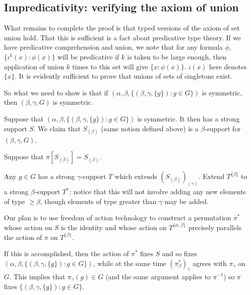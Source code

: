 \documentclass[112pt]{article}
\begin{document}
\newpage
\subsection{Impredicativity:  verifying the axiom of union}

What remains to complete the proof is that typed versions of the axiom of set union hold.  That this is sufficient is a fact about predicative type theory.
If we have predicative comprehension and union, we note that for any formula $\phi$, $\{\iota^k(x):\phi(x)\}$ will be predicative if $k$ is taken to be large enough, then application of union $k$ times to this set will give $\{x:\phi(x)\}$.  $\iota(x)$ here denotes $\{x\}$.  It is evidently sufficient to prove that unions of sets of singletons exist.

So what we need to show is that if $(\alpha,\beta,\{(\beta,\gamma,\{g\}):g \in G\})$ is symmetric, then $(\beta,\gamma,G)$ is symmetric.

Suppose that $(\alpha,\beta,\{(\beta,\gamma,\{g\}):g \in G\})$ is symmetric.  It then has a strong support $S$.  We claim that $S_{(\beta)}$ (same notion defined above) is a $\beta$-support for $(\beta,\gamma,G)$.

Suppose that $\pi[S_{(\beta)}]=S_{(\beta)}$.  

Any $g \in G$ has a strong $\gamma$-support $T$ which extends $(S_{(\beta)})_{(\gamma)}$.   Extend $T^{\{\beta\}}$ to a strong $\beta$-support $T^*$:  notice
that this will not involve adding any new elements of type $\geq \beta$, though elements of type greater than $\gamma$ may be added.



Our plan is to use freedom of action technology to construct a permutation $\pi^*$ whose action on $S$ is the identity
and whose action on $T^{\{\alpha,\beta\}}$ precisely parallels the action of $\pi$ on $T^{\{\beta\}}$.

If this is accomplished, then the action of $\pi^*$ fixes $S$ and so fixes $(\alpha,\beta,\{(\beta,\gamma,\{g\}):g \in G\})$, while at the same
time $(\pi^*_\beta)_\gamma$ agrees with $\pi_\gamma$ on $G$.  This implies that $\pi_\gamma(g) \in G$ (and the same argument applies to $\pi^{-1}$)
so $\pi$ fixes $\{(\beta,\gamma,\{g\}):g \in G\}$.
\end{document}
